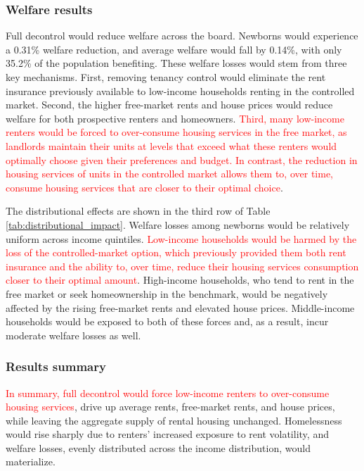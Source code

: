 \documentclass[parskip=full]{article}
\begin{document}
\subsubsection{Welfare results}

Full decontrol would reduce welfare across the board. Newborns would experience a 0.31\% welfare reduction, and average welfare would fall by 0.14\%, with only 35.2\% of the population benefiting. These welfare losses would stem from three key mechanisms. First, removing tenancy control would eliminate the rent insurance previously available to low-income households renting in the controlled market. Second, the higher free-market rents and house prices would reduce welfare for both prospective renters and homeowners. \textcolor{red}{Third, many low-income renters would be forced to over-consume housing services in the free market, as landlords maintain their units at levels that exceed what these renters would optimally choose given their preferences and budget. In contrast, the reduction in housing services of units in the controlled market allows them to, over time, consume housing services that are closer to their optimal choice}.

The distributional effects are shown in the third row of Table \ref{tab:distributional_impact}. Welfare losses among newborns would be relatively uniform across income quintiles. \textcolor{red}{Low-income households would be harmed by the loss of the controlled-market option, which previously provided them both rent insurance and the ability to, over time, reduce their housing services consumption closer to their optimal amount}. High-income households, who tend to rent in the free market or seek homeownership in the benchmark, would be negatively affected by the rising free-market rents and elevated house prices. Middle-income households would be exposed to both of these forces and, as a result, incur moderate welfare losses as well.

\subsubsection{Results summary}

\textcolor{red}{In summary, full decontrol would force low-income renters to over-consume housing services}, drive up average rents, free-market rents, and house prices, while leaving the aggregate supply of rental housing unchanged. Homelessness would rise sharply due to renters' increased exposure to rent volatility, and welfare losses, evenly distributed across the income distribution, would materialize.
\end{document}
